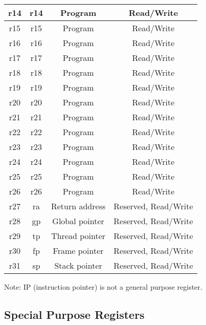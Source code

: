 \documentclass{article}
\begin{document}
\begin{table}[H]
\begin{tabular}{|c|c|c|c|}
    \hline r14  &   r14     &   Program             &   Read/Write \\
    \hline r15  &   r15     &   Program             &   Read/Write \\
    \hline r16  &   r16     &   Program             &   Read/Write \\
    \hline r17  &   r17     &   Program             &   Read/Write \\
    \hline r18  &   r18     &   Program             &   Read/Write \\
    \hline r19  &   r19     &   Program             &   Read/Write \\
    \hline r20  &   r20     &   Program             &   Read/Write \\
    \hline r21  &   r21     &   Program             &   Read/Write \\
    \hline r22  &   r22     &   Program             &   Read/Write \\
    \hline r23  &   r23     &   Program             &   Read/Write \\
    \hline r24  &   r24     &   Program             &   Read/Write \\
    \hline r25  &   r25     &   Program             &   Read/Write \\
    \hline r26  &   r26     &   Program             &   Read/Write \\
    \hline r27  &   ra      &   Return address      &   Reserved, Read/Write \\
    \hline r28  &   gp      &   Global pointer      &   Reserved, Read/Write \\
    \hline r29  &   tp      &   Thread pointer      &   Reserved, Read/Write \\
    \hline r30  &   fp      &   Frame pointer       &   Reserved, Read/Write \\
    \hline r31  &   sp      &   Stack pointer       &   Reserved, Read/Write \\
    \hline
    \end{tabular}
    \end{table}
    
    Note: IP (instruction pointer) is not a general purpose register.
    
    \subsection{Special Purpose Registers}
        
\end{document}
